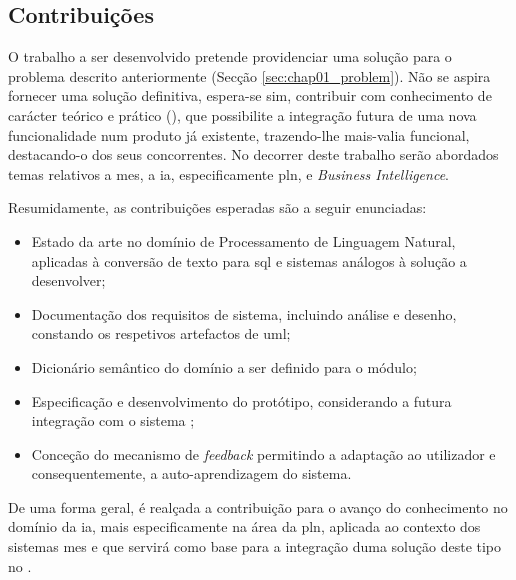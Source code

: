 \subsection{Contribuições}
\label{sec:chap01_contributions}
O trabalho a ser desenvolvido pretende providenciar uma solução para o problema descrito anteriormente (Secção \ref{sec:chap01_problem}). Não se aspira fornecer uma solução definitiva, espera-se sim, contribuir com conhecimento de carácter teórico e prático (), que possibilite a integração futura de uma nova funcionalidade num produto já existente, trazendo-lhe mais-valia funcional, destacando-o dos seus concorrentes. No decorrer deste trabalho serão abordados temas relativos a \gls{mes}, a \gls{ia}, especificamente \gls{pln}, e \textit{Business Intelligence}.

Resumidamente, as contribuições esperadas são a seguir enunciadas:

\begin{itemize}
    \item
    {
        Estado da arte no domínio de Processamento de Linguagem Natural, aplicadas à conversão de texto para \gls{sql} e sistemas análogos à solução a desenvolver;
    }
    \item 
    {
        Documentação dos requisitos de sistema, incluindo análise e desenho, constando os respetivos artefactos de \gls{uml};
    }
    \item 
    {
        Dicionário semântico do domínio a ser definido para o módulo;
    }
    \item
    {
        Especificação e desenvolvimento do protótipo, considerando a futura integração com o sistema {\productname};
    }
    \item
    {
        Conceção do mecanismo de \textit{feedback} permitindo a adaptação ao utilizador e consequentemente, a auto-aprendizagem do sistema.
    }
\end{itemize}

De uma forma geral, é realçada a contribuição para o avanço do conhecimento no domínio da \gls{ia}, mais especificamente na área da \gls{pln}, aplicada ao contexto dos sistemas \gls{mes} e que servirá como base para a integração duma solução deste tipo no {\productname}.